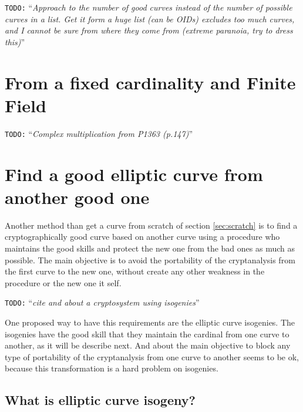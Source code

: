 \documentclass[10pt,a4paper,twoside]{llncs}
\newcommand{\todo}[1]{\texttt{\color{red}TODO:} ``\emph{#1}''}
\begin{document}
\todo{Approach to the number of good curves instead of the number of possible curves in a list. Get it form a huge list (can be OIDs) excludes too much curves, and I cannot be sure from where they come from (extreme paranoia, try to dress this)}
\cite{DAS_guide}%

\section{From a fixed cardinality and Finite Field}

\todo{Complex multiplication from P1363 (p.147)}

\section{Find a good elliptic curve from another good one \label{sec:from_another}}

Another method than get a curve from scratch of section \ref{sec:scratch} is to find a cryptographically good curve based on another curve using a procedure who maintains the good skills and protect the new one from the bad ones as much as possible. The main objective is to avoid the portability of the cryptanalysis from the first curve to the new one, without create any other weakness in the procedure or the new one it self.

\todo{cite \cite{Rostovtsev06public} and \cite{isoTFC} about a cryptosystem using isogenies}

One proposed way to have this requirements are the elliptic curve isogenies. The isogenies have the good skill that they maintain the cardinal from one curve to another, as it will be describe next. And about the main objective to block any type of portability of the cryptanalysis from one curve to another seems to be ok, because this transformation is a hard problem on isogenies.

\subsection{What is elliptic curve isogeny? \label{sec:isog}}
\end{document}
